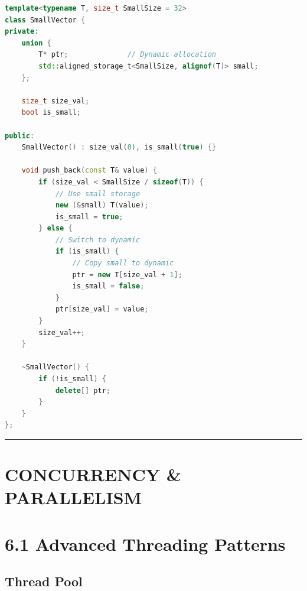 \begin{lstlisting}[language={C++}]
template<typename T, size_t SmallSize = 32>
class SmallVector {
private:
    union {
        T* ptr;              // Dynamic allocation
        std::aligned_storage_t<SmallSize, alignof(T)> small;
    };
    
    size_t size_val;
    bool is_small;
    
public:
    SmallVector() : size_val(0), is_small(true) {}
    
    void push_back(const T& value) {
        if (size_val < SmallSize / sizeof(T)) {
            // Use small storage
            new (&small) T(value);
            is_small = true;
        } else {
            // Switch to dynamic
            if (is_small) {
                // Copy small to dynamic
                ptr = new T[size_val + 1];
                is_small = false;
            }
            ptr[size_val] = value;
        }
        size_val++;
    }
    
    ~SmallVector() {
        if (!is_small) {
            delete[] ptr;
        }
    }
};
\end{lstlisting}

\begin{center}\rule{0.5\linewidth}{0.5pt}\end{center}

\hypertarget{concurrency-parallelism}{%
\section{CONCURRENCY \& PARALLELISM}\label{concurrency-parallelism}}

\hypertarget{advanced-threading-patterns}{%
\section{6.1 Advanced Threading
Patterns}\label{advanced-threading-patterns}}

\hypertarget{thread-pool}{%
\subsection{Thread Pool}\label{thread-pool}}

